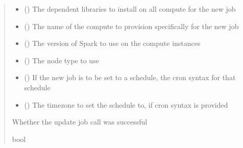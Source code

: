 \documentclass[letterpaper,10pt,english]{sphinxmanual}
\begin{document}
\begin{fulllineitems}
\begin{fulllineitems}
\begin{quote}
\begin{description}
\begin{itemize}
\item {} 
\sphinxAtStartPar
{} () \textendash{} The dependent libraries to install on all compute for the new job

\item {} 
\sphinxAtStartPar
{} () \textendash{} The name of the compute to provision specifically for the new job

\item {} 
\sphinxAtStartPar
{} () \textendash{} The version of Spark to use on the compute instances

\item {} 
\sphinxAtStartPar
{} () \textendash{} The node type to use

\item {} 
\sphinxAtStartPar
{} (\sphinxstyleliteralemphasis{\sphinxupquote{ (}}\sphinxstyleliteralemphasis{\sphinxupquote{)}}) \textendash{} If the new job is to be set to a schedule, the cron syntax for that schedule

\item {} 
\sphinxAtStartPar
{} (\sphinxstyleliteralemphasis{\sphinxupquote{ (}}\sphinxstyleliteralemphasis{\sphinxupquote{)}}) \textendash{} The timezone to set the schedule to, if cron syntax is provided

\end{itemize}

\sphinxAtStartPar
{} \textendash{} Whether the update job call was successful

\sphinxAtStartPar
bool


\end{description}
\end{quote}
\end{fulllineitems}
\end{fulllineitems}
\end{document}
